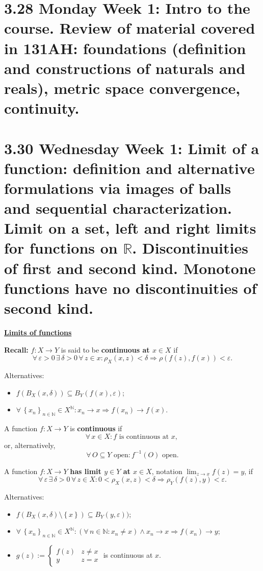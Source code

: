 \documentclass{notes}
\begin{document}
  \section{3.28 Monday Week 1: Intro to the course. Review of material covered in 131AH: foundations (definition and constructions of naturals and reals), metric space convergence, continuity.}
  
  \section{3.30 Wednesday Week 1: Limit of a function: definition and alternative formulations via images of balls and sequential characterization. Limit on a set, left and right limits for functions on \texorpdfstring{$\mathbb R$}{R}. Discontinuities of first and second kind. Monotone functions have no discontinuities of second kind.}
  
  \underline{{\boldmath \bfseries Limits of functions}}
  
  \textbf{Recall:} $f \colon X \to Y$ is said to be {\boldmath \bfseries continuous at $x \in X$} if 
  \[
    \forall \, \varepsilon > 0 \, \exists \, \delta > 0 \, \forall \, z \in x: \rho_X(x, z) < \delta \Rightarrow \rho(f(z), f(x)) < \varepsilon.
  \]

  Alternatives:
  \begin{itemize}
    \item $f(B_X(x, \delta)) \subseteq B_Y(f(x), \varepsilon)$; 
    \item $\forall \, \left \{ x_n \right \}_{n \in \mathbb N} \in X^\mathbb N: x_n \to x \Rightarrow f(x_n) \to f(x)$.
  \end{itemize}
  
  A function $f \colon X \to Y$ is {\boldmath \bfseries continuous} if 
  \[
    \forall \, x \in X: \text{$f$ is continuous at $x$, }
  \]
  or, alternatively,  
  \[
    \forall \, O \subseteq Y \text{ open}: f^{-1}(O) \text{ open.}
  \]

  \begin{defn}
    A function $f \colon X \to Y$ {\boldmath \bfseries has limit $y \in Y$ at $x \in X$}, notation $\lim_{z \to x} f(z) = y$, if 
    \[
      \forall \, \varepsilon \, \exists \, \delta > 0 \, \forall \, z \in X: 0 < \rho_X(x, z) < \delta \Rightarrow \rho_Y(f(z), y) < \varepsilon.
    \]
    
    Alternatives: 
    \begin{itemize}
      \item $f(B_X(x, \delta) \setminus \left \{ x \right \}) \subseteq B_Y(y, \varepsilon))$; 

      \item $\forall \, \left \{ x_n \right \}_{n \in \mathbb N} \in X^\mathbb N: (\forall \, n \in \mathbb N: x_n \neq x) \land x_n \to x \Rightarrow f(x_n) \to y$; 
        
      \item $g(z) := \begin{cases}
        f(z) & z \neq x \\ 
        y & z = x
      \end{cases}$ is continuous at $x$.
    \end{itemize}
  \end{defn}
  
\end{document}
